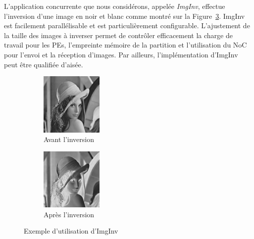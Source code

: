 \documentclass[main.tex]{subfiles}
\begin{document}
L'application concurrente que nous considérons, appelée \emph{ImgInv}, effectue l'inversion d'une image en noir et blanc comme montré sur la Figure~\ref{fig_resumeFr_ImgInv_Lenna}. ImgInv est facilement parallélisable et est particulièrement configurable. L'ajustement de la taille des images à inverser permet de contrôler efficacement la charge de travail pour les PEs, l'empreinte mémoire de la partition et l'utilisation du NoC pour l'envoi et la réception d'images. Par ailleurs, l'implémentation d'ImgInv peut être qualifiée d'aisée.

\begin{figure}
    \centering
    \begin{subfigure}[b]{0.45\linewidth}
        \centering
        \includegraphics[width=3cm]{imgs/png/implemExecModel_ImgInv_LennaNormal.png}
        \caption{Avant l'inversion}
        \label{fig_resumeFr_ImgInv_LennaNormal}
    \end{subfigure}
    \begin{subfigure}[b]{0.45\linewidth}
    \centering
        \includegraphics[width=3cm]{imgs/png/implemExecModel_ImgInv_LennaInverted.png}
        \caption{Après l'inversion}
        \label{fig_resumeFr_ImgInv_LennaNormal}
    \end{subfigure}
    \caption{Exemple d'utilisation d'ImgInv}
    \label{fig_resumeFr_ImgInv_Lenna}
\end{figure}
\end{document}
